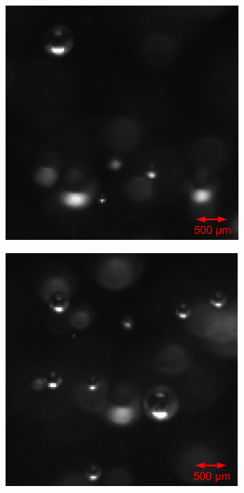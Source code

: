 		\begin{figure}[h]			
			\begin{subfigure}[t]{.4\textwidth}
				\centering
				\includegraphics[scale=0.5]{images/aq_result_low_small_1.png}
				\caption{}
				\label{subfig:low_a}
			\end{subfigure}\hfill
			\begin{subfigure}[t]{.4\textwidth}
				\centering
				\includegraphics[scale=0.5]{images/aq_result_low_small_2.png}				
				\caption{}
				\label{subfig:low_b}				
			\end{subfigure}
			

\end{figure}

